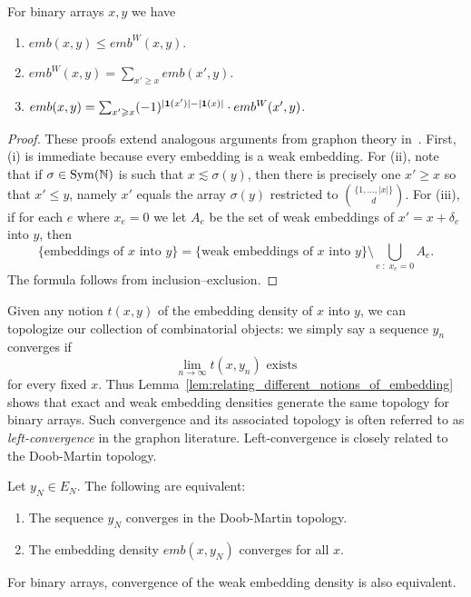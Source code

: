 \begin{lemma}
\label{lem:relating_different_notions_of_embedding}
    For binary arrays $x,y$ we have

    \begin{enumerate}[label=(\roman*)]
        \item $emb(x,y) \leq emb^W(x,y)$.
        \item $emb^W(x,y) = \sum_{x' \geq x} emb(x',y)$.
        \item $emb(x,y) = \sum_{x' \geqslant x} (-1)^{|\mathbf{1}(x')| - |\mathbf{1}(x)|} \cdot emb^W(x',y)$.
    \end{enumerate}

\end{lemma}

\begin{proof}
These proofs extend analogous arguments from graphon theory in~\cite{meliot2024_graphons_permutons_survey}.
First, (i) is immediate because every embedding is a weak embedding. For (ii), note that if
$\sigma \in \operatorname{Sym}(\mathbb{N})$ is such that $x \lesssim \sigma(y)$,
 then there is precisely one $x' \geq x$ so that $x' \leq y$, namely $x'$ equals the array
 $\sigma(y)$ restricted to $\binom{\{1,\ldots,|x|\}}{d}$. For (iii), if for each $e$ where $x_e=0$ we let $A_e$ be the set of weak embeddings of $x'=x+\delta_e$ into $y$, then
%
\[\{\text{embeddings of $x$ into $y$}\} = \{\text{weak embeddings of $x$ into $y$}\} \setminus \bigcup_{e \;:\; x_e=0} A_e.\]
%
\noindent The formula follows from inclusion--exclusion.
\end{proof}

\noindent Given any notion $t(x,y)$ of the embedding density of $x$ into $y$, we can topologize our collection
of combinatorial objects: we simply say a sequence $y_n$ converges if
%
    \[\lim_{n \to \infty} t(x, y_n) \text{ exists}\]
%
for every fixed $x$. Thus Lemma~\ref{lem:relating_different_notions_of_embedding}
shows that exact and weak embedding densities generate the same topology for
binary arrays.
Such convergence and its associated topology is often referred to as \textit{left-convergence}
in the graphon literature. Left-convergence is closely related to the Doob-Martin topology.

\begin{lemma}
\label{lem:equivalence_of_dm_and_density_convergence}
    Let $y_N\in E_N$. The following are equivalent:
        \begin{enumerate}[label=(\roman*)]
            \item The sequence $y_N$ converges in the Doob-Martin topology.
            \item The embedding density $emb(x, y_N)$ converges for all $x$.
        \end{enumerate}

    \noindent For binary arrays, convergence of the weak embedding density is also equivalent.

\end{lemma}

